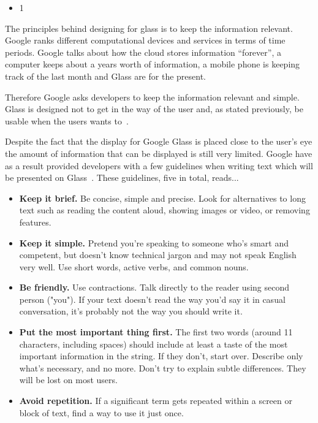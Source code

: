 \begin{itemize}
\item{1}
\end{itemize}

The principles behind designing for glass is to keep the information relevant. Google ranks different computational devices and services in terms of time periods. Google talks about how the cloud stores information ``forever'', a computer keeps about a years worth of information, a mobile phone is keeping track of the last month and Glass are for the present.

Therefore Google asks developers to keep the information relevant and simple. Glass is designed not to get in the way of the user and, as stated previously, be usable when the users wants to~\cite{glassDesignPrinciples}.



Despite the fact that the display for Google Glass is placed close to the user's eye the amount of information that can be displayed is still very limited. Google have as a result provided developers with a few guidelines when writing text which will be presented on Glass~\cite{glassDesignStyle}. These guidelines, five in total, reads...

\begin{itemize}
	\item \textbf{Keep it brief.} Be concise, simple and precise. Look for alternatives to long text such as reading the content aloud, showing images or video, or removing features.
	\item \textbf{Keep it simple.} Pretend you're speaking to someone who's smart and competent, but doesn't know technical jargon and may not speak English very well. Use short words, active verbs, and common nouns.
	\item \textbf{Be friendly.} Use contractions. Talk directly to the reader using second person ("you"). If your text doesn't read the way you'd say it in casual conversation, it's probably not the way you should write it.
	\item \textbf{Put the most important thing first.} The first two words (around 11 characters, including spaces) should include at least a taste of the most important information in the string. If they don't, start over. Describe only what's necessary, and no more. Don't try to explain subtle differences. They will be lost on most users.
	\item \textbf{Avoid repetition.} If a significant term gets repeated within a screen or block of text, find a way to use it just once.
\end{itemize}

